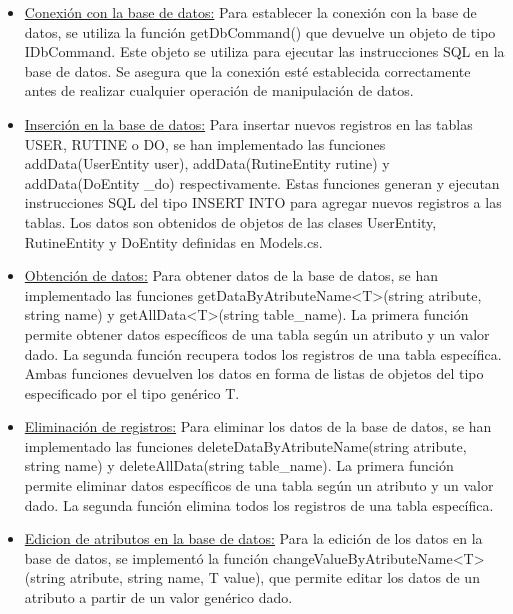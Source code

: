 \begin{itemize}
    \item \underline{Conexión con la base de datos:} Para establecer la conexión con la base de datos, se utiliza la función getDbCommand() que devuelve un objeto de tipo IDbCommand. Este objeto se utiliza para ejecutar las instrucciones SQL en la base de datos. Se asegura que la conexión esté establecida correctamente antes de realizar cualquier operación de manipulación de datos.
    
    \item \underline{Inserción en la base de datos:} Para insertar nuevos registros en las tablas USER, RUTINE o DO, se han implementado las funciones addData(UserEntity user), addData(RutineEntity rutine) y addData(DoEntity \_do) respectivamente. Estas funciones generan y ejecutan instrucciones SQL del tipo INSERT INTO para agregar nuevos registros a las tablas. Los datos son obtenidos de objetos de las clases UserEntity, RutineEntity y DoEntity definidas en Models.cs.

    \item \underline{Obtención de datos:} Para obtener datos de la base de datos, se han implementado las funciones getDataByAtributeName<T>(string atribute, string name) y getAllData<T>(string table\_name). La primera función permite obtener datos específicos de una tabla según un atributo y un valor dado. La segunda función recupera todos los registros de una tabla específica. Ambas funciones devuelven los datos en forma de listas de objetos del tipo especificado por el tipo genérico T.

    \item \underline{Eliminación de registros:} Para eliminar los datos de la base de datos, se han implementado las funciones deleteDataByAtributeName(string atribute, string name) y deleteAllData(string table\_name). La primera función permite eliminar datos específicos de una tabla según un atributo y un valor dado. La segunda función elimina todos los registros de una tabla específica.

    \item \underline{Edicion de atributos en la base de datos:} Para la edición de los datos en la base de datos, se implementó la función changeValueByAtributeName<T>(string atribute, string name, T value), que permite editar los datos de un atributo a partir de un valor genérico dado.

\end{itemize}